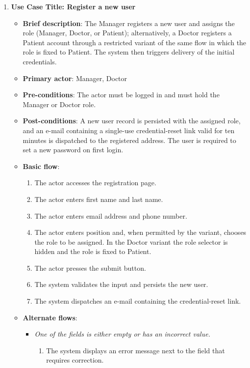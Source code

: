 \begin{enumerate}
\vspace{0.5em}

\item \textbf{Use Case Title: Register a new user}
\begin{itemize}
    \item \textbf{Brief description}: The Manager registers a new user and assigns the role (Manager, Doctor, or Patient); alternatively, a Doctor registers a Patient account through a restricted variant of the same flow in which the role is fixed to Patient. The system then triggers delivery of the initial credentials.
    \item \textbf{Primary actor}: Manager, Doctor
    \item \textbf{Pre-conditions}: The actor must be logged in and must hold the Manager or Doctor role.
    \item \textbf{Post-conditions}: A new user record is persisted with the assigned role, and an e-mail containing a single-use credential-reset link valid for ten minutes is dispatched to the registered address. The user is required to set a new password on first login.
    \item \textbf{Basic flow}:
    \begin{enumerate}
        \item The actor accesses the registration page.
        \item The actor enters first name and last name.
        \item The actor enters email address and phone number.
        \item The actor enters position and, when permitted by the variant, chooses the role to be assigned. In the Doctor variant the role selector is hidden and the role is fixed to Patient.
        \item The actor presses the submit button.
        \item The system validates the input and persists the new user.
        \item The system dispatches an e-mail containing the credential-reset link.
    \end{enumerate}
    \item \textbf{Alternate flows}:
    \begin{itemize}
        \item[6a.] \textit{One of the fields is either empty or has an incorrect value.}
        \begin{enumerate}
            \item The system displays an error message next to the field that requires correction.

\end{enumerate}
\end{itemize}
\end{itemize}
\end{enumerate}
